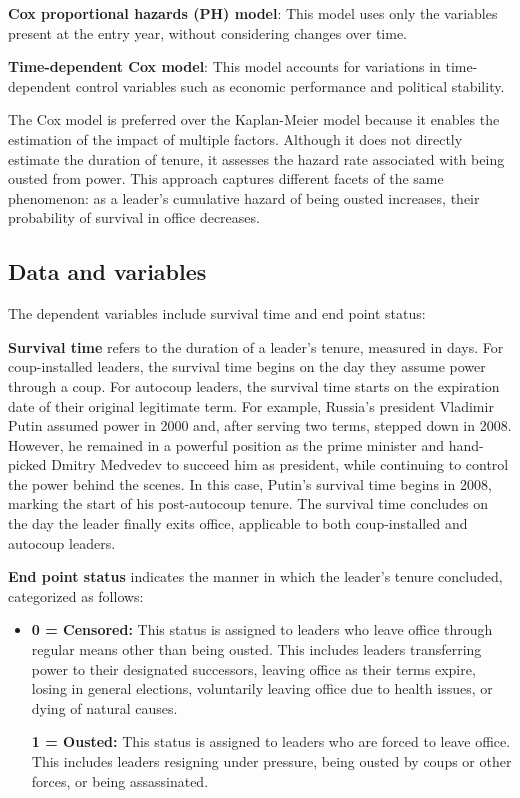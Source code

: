 \documentclass[
  12pt,
]{report}
\begin{document}
\textbf{Cox proportional hazards (PH) model}: This model uses only the
variables present at the entry year, without considering changes over
time.

\textbf{Time-dependent Cox model}: This model accounts for variations in
time-dependent control variables such as economic performance and
political stability.

The Cox model is preferred over the Kaplan-Meier model because it
enables the estimation of the impact of multiple factors. Although it
does not directly estimate the duration of tenure, it assesses the
hazard rate associated with being ousted from power. This approach
captures different facets of the same phenomenon: as a leader's
cumulative hazard of being ousted increases, their probability of
survival in office decreases.

\subsection{Data and variables}\label{data-and-variables-1}

The dependent variables include survival time and end point status:

\textbf{Survival time} refers to the duration of a leader's tenure,
measured in days. For coup-installed leaders, the survival time begins
on the day they assume power through a coup. For autocoup leaders, the
survival time starts on the expiration date of their original legitimate
term. For example, Russia's president Vladimir Putin assumed power in
2000 and, after serving two terms, stepped down in 2008. However, he
remained in a powerful position as the prime minister and hand-picked
Dmitry Medvedev to succeed him as president, while continuing to control
the power behind the scenes. In this case, Putin's survival time begins
in 2008, marking the start of his post-autocoup tenure. The survival
time concludes on the day the leader finally exits office, applicable to
both coup-installed and autocoup leaders.

\textbf{End point status} indicates the manner in which the leader's
tenure concluded, categorized as follows:

\begin{itemize}
\item
  \textbf{0 = Censored:} This status is assigned to leaders who leave
  office through regular means other than being ousted. This includes
  leaders transferring power to their designated successors, leaving
  office as their terms expire, losing in general elections, voluntarily
  leaving office due to health issues, or dying of natural causes.

  \textbf{1 = Ousted:} This status is assigned to leaders who are forced
  to leave office. This includes leaders resigning under pressure, being
  ousted by coups or other forces, or being assassinated.
\end{itemize}
\end{document}
